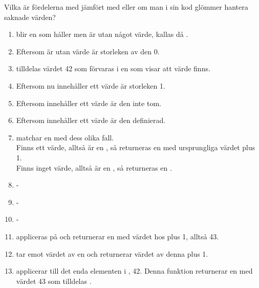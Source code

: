 \Subtask Vilka är fördelerna med  jämfört med  eller  om man i sin kod glömmer hantera saknade värden?

\SOLUTION


\TaskSolved \what


\SubtaskSolved  \begin{enumerate}
\item {} blir en  som håller  men är utan något värde, kallas då .
\item Eftersom  är utan värde är storleken av den 0.
\item {} tilldelas värdet 42 som förvaras i en  som visar att värde finns.
\item Eftersom  nu innehåller ett värde är storleken 1.
\item Eftersom  innehåller ett värde är den inte tom.
\item Eftersom  innehåller ett värde är den definierad.
\item {} matchar en  med dess olika fall.\\
Finns ett värde, alltså  är en , så returneras en  med ursprungliga värdet plus 1.\\
Finns inget värde, alltså  är en , så returneras en .
\item -
\item -
\item -
\item {} appliceras på  och returnerar en  med värdet hos  plus 1, alltså 43.
\item {} tar emot värdet av en  och returnerar värdet av denna plus 1.
\item {} applicerar  till det enda elementen i , 42. Denna funktion returnerar en  med värdet 43 som tilldelas .
\end{enumerate}

